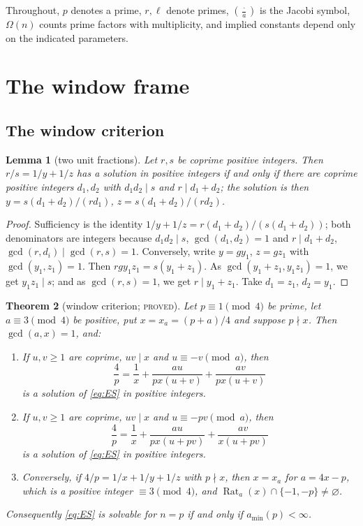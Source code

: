 \documentclass[11pt,reqno]{amsart}
\newtheorem{theorem}{Theorem}[section]
\newtheorem{lemma}[theorem]{Lemma}
\theoremstyle{definition}
\newcommand{\Rat}{\operatorname{Rat}}
\newcommand{\amin}{a_{\min}}
\newcommand{\leg}[2]{\left(\frac{#1}{#2}\right)}
\newcommand{\status}[1]{\textup{\textsc{#1}}}
\begin{document}
Throughout, $p$ denotes a prime, $r,\ell$ denote primes, $\leg{\cdot}{a}$
is the Jacobi symbol, $\Omega(n)$ counts prime factors with multiplicity,
and implied constants depend only on the indicated parameters.

\section{The window frame}\label{sec:frame}

\subsection{The window criterion}

\begin{lemma}[two unit fractions]\label{lem:two}
Let $r,s$ be coprime positive integers.  Then $r/s=1/y+1/z$ has a solution
in positive integers if and only if there are coprime positive integers
$d_1,d_2$ with $d_1d_2\mid s$ and $r\mid d_1+d_2$; the solution is then
$y=s(d_1+d_2)/(rd_1)$, $z=s(d_1+d_2)/(rd_2)$.
\end{lemma}

\begin{proof}
Sufficiency is the identity $1/y+1/z=r(d_1+d_2)/(s(d_1+d_2))$; both
denominators are integers because $d_1d_2\mid s$, $\gcd(d_1,d_2)=1$ and
$r\mid d_1+d_2$, $\gcd(r,d_i)\mid\gcd(r,s)=1$.  Conversely, write $y=gy_1$,
$z=gz_1$ with $\gcd(y_1,z_1)=1$.  Then $rgy_1z_1=s(y_1+z_1)$.  As
$\gcd(y_1+z_1,y_1z_1)=1$, we get $y_1z_1\mid s$; and as $\gcd(r,s)=1$, we
get $r\mid y_1+z_1$.  Take $d_1=z_1$, $d_2=y_1$.
\end{proof}

\begin{theorem}[window criterion; \status{proved}]\label{thm:frame}
Let $p\equiv1\pmod4$ be prime, let $a\equiv3\pmod4$ be positive, put
$x=x_a=(p+a)/4$ and suppose $p\nmid x$.  Then $\gcd(a,x)=1$, and:
\begin{enumerate}
\item If $u,v\ge1$ are coprime, $uv\mid x$ and $u\equiv-v\pmod a$, then
 \begin{equation}\label{eq:typeII}
 \frac4p=\frac1x+\frac{au}{px(u+v)}+\frac{av}{px(u+v)}
 \end{equation}
 is a solution of \eqref{eq:ES} in positive integers.
\item If $u,v\ge1$ are coprime, $uv\mid x$ and $u\equiv-pv\pmod a$, then
 \begin{equation}\label{eq:typeI}
 \frac4p=\frac1x+\frac{au}{px(u+pv)}+\frac{av}{x(u+pv)}
 \end{equation}
 is a solution of \eqref{eq:ES} in positive integers.
\item Conversely, if $4/p=1/x+1/y+1/z$ with $p\nmid x$, then $x=x_a$ for
 $a=4x-p$, which is a positive integer $\equiv3\pmod4$, and
 $\Rat_a(x)\cap\{-1,-p\}\neq\varnothing$.
\end{enumerate}
Consequently \eqref{eq:ES} is solvable for $n=p$ if and only if
$\amin(p)<\infty$.
\end{theorem}
\end{document}
